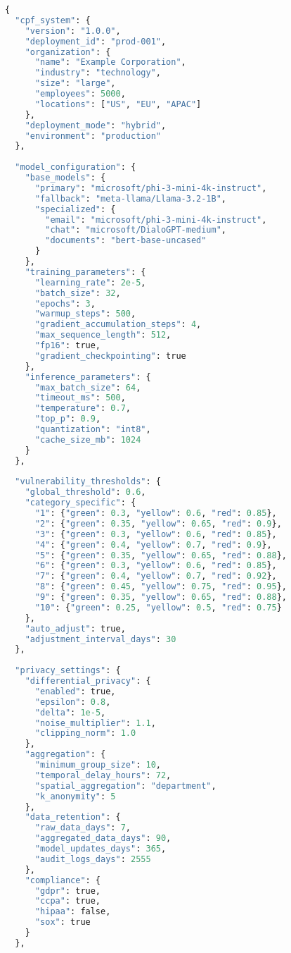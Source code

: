 \documentclass[11pt,a4paper]{article}
\begin{document}
\begin{lstlisting}[language=Python, caption=Master CPF Configuration]
{
  "cpf_system": {
    "version": "1.0.0",
    "deployment_id": "prod-001",
    "organization": {
      "name": "Example Corporation",
      "industry": "technology",
      "size": "large",
      "employees": 5000,
      "locations": ["US", "EU", "APAC"]
    },
    "deployment_mode": "hybrid",
    "environment": "production"
  },
  
  "model_configuration": {
    "base_models": {
      "primary": "microsoft/phi-3-mini-4k-instruct",
      "fallback": "meta-llama/Llama-3.2-1B",
      "specialized": {
        "email": "microsoft/phi-3-mini-4k-instruct",
        "chat": "microsoft/DialoGPT-medium",
        "documents": "bert-base-uncased"
      }
    },
    "training_parameters": {
      "learning_rate": 2e-5,
      "batch_size": 32,
      "epochs": 3,
      "warmup_steps": 500,
      "gradient_accumulation_steps": 4,
      "max_sequence_length": 512,
      "fp16": true,
      "gradient_checkpointing": true
    },
    "inference_parameters": {
      "max_batch_size": 64,
      "timeout_ms": 500,
      "temperature": 0.7,
      "top_p": 0.9,
      "quantization": "int8",
      "cache_size_mb": 1024
    }
  },
  
  "vulnerability_thresholds": {
    "global_threshold": 0.6,
    "category_specific": {
      "1": {"green": 0.3, "yellow": 0.6, "red": 0.85},
      "2": {"green": 0.35, "yellow": 0.65, "red": 0.9},
      "3": {"green": 0.3, "yellow": 0.6, "red": 0.85},
      "4": {"green": 0.4, "yellow": 0.7, "red": 0.9},
      "5": {"green": 0.35, "yellow": 0.65, "red": 0.88},
      "6": {"green": 0.3, "yellow": 0.6, "red": 0.85},
      "7": {"green": 0.4, "yellow": 0.7, "red": 0.92},
      "8": {"green": 0.45, "yellow": 0.75, "red": 0.95},
      "9": {"green": 0.35, "yellow": 0.65, "red": 0.88},
      "10": {"green": 0.25, "yellow": 0.5, "red": 0.75}
    },
    "auto_adjust": true,
    "adjustment_interval_days": 30
  },
  
  "privacy_settings": {
    "differential_privacy": {
      "enabled": true,
      "epsilon": 0.8,
      "delta": 1e-5,
      "noise_multiplier": 1.1,
      "clipping_norm": 1.0
    },
    "aggregation": {
      "minimum_group_size": 10,
      "temporal_delay_hours": 72,
      "spatial_aggregation": "department",
      "k_anonymity": 5
    },
    "data_retention": {
      "raw_data_days": 7,
      "aggregated_data_days": 90,
      "model_updates_days": 365,
      "audit_logs_days": 2555
    },
    "compliance": {
      "gdpr": true,
      "ccpa": true,
      "hipaa": false,
      "sox": true
    }
  },
  

\end{lstlisting}
\end{document}
